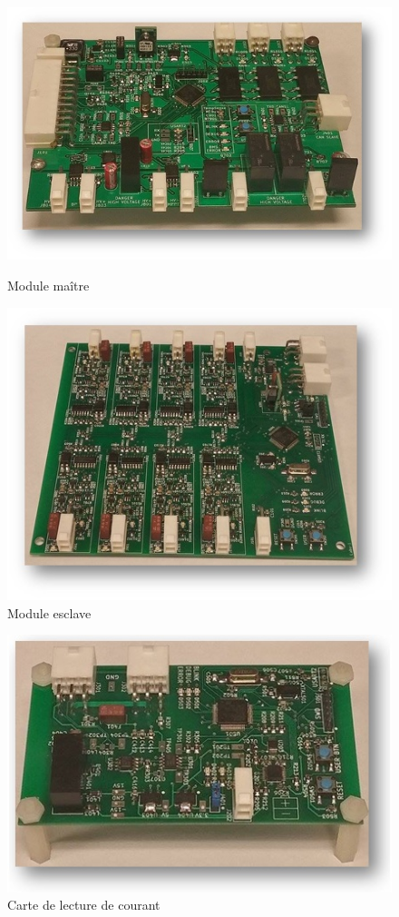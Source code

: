 		\begin{figure}[H]
			\begin{minipage}{0.45\textwidth}
				\centering
				\includegraphics[scale=0.5]{images/master.jpg}
				\caption{Module maître}
				\label{fig:titre1}
			\end{minipage}
			\hfill
			\begin{minipage}{0.45\textwidth}
				\centering
				\includegraphics[scale=0.5]{images/slave.jpg}
				\caption{Module esclave}
				\label{fig:titre2}
			\end{minipage}	
		\end{figure}
	
		\begin{figure}[H]
			\centering
			\includegraphics[scale=0.5]{images/currentsense.jpg}
			\caption{Carte de lecture de courant}
			\label{fig:titre3}
		\end{figure}